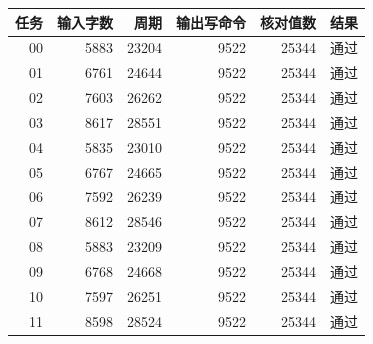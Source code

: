 \begin{tabular}{rrrrrl}\toprule
任务 & 输入字数 & 周期 & 输出写命令 & 核对值数 & 结果\\\midrule
00 & 5883 & 23204 & 9522 & 25344 & 通过 \\
01 & 6761 & 24644 & 9522 & 25344 & 通过 \\
02 & 7603 & 26262 & 9522 & 25344 & 通过 \\
03 & 8617 & 28551 & 9522 & 25344 & 通过 \\
04 & 5835 & 23010 & 9522 & 25344 & 通过 \\
05 & 6767 & 24665 & 9522 & 25344 & 通过 \\
06 & 7592 & 26239 & 9522 & 25344 & 通过 \\
07 & 8612 & 28546 & 9522 & 25344 & 通过 \\
08 & 5883 & 23209 & 9522 & 25344 & 通过 \\
09 & 6768 & 24668 & 9522 & 25344 & 通过 \\
10 & 7597 & 26251 & 9522 & 25344 & 通过 \\
11 & 8598 & 28524 & 9522 & 25344 & 通过 \\
\bottomrule\end{tabular}
